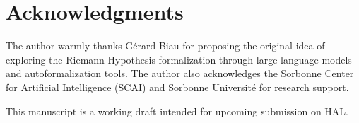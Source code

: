 \documentclass[11pt,a4paper]{article}
\theoremstyle{definition}
\theoremstyle{remark}
\begin{document}
\section*{Acknowledgments}

The author warmly thanks G\'erard Biau for proposing the original idea of exploring the Riemann Hypothesis formalization through large language models and autoformalization tools. The author also acknowledges the Sorbonne Center for Artificial Intelligence (SCAI) and Sorbonne Universit\'e for research support.

This manuscript is a working draft intended for upcoming submission on HAL.

\end{document}
